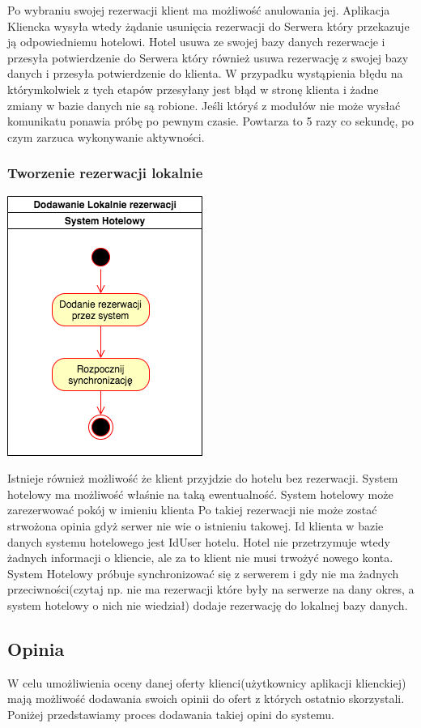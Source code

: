 \documentclass{article}
\begin{document}
Po wybraniu swojej rezerwacji klient ma możliwość anulowania jej. Aplikacja Kliencka wysyła wtedy żądanie usunięcia rezerwacji do Serwera który przekazuje ją odpowiedniemu hotelowi. Hotel usuwa ze swojej bazy danych rezerwacje i przesyła potwierdzenie do Serwera który również usuwa rezerwację z swojej bazy danych i przesyła potwierdzenie do klienta. W przypadku wystąpienia błędu na którymkolwiek z tych etapów przesyłany jest błąd w stronę klienta i żadne zmiany w bazie danych nie są robione.
Jeśli któryś z modułów nie może wysłać komunikatu ponawia próbę po pewnym czasie. Powtarza to 5 razy co sekundę, po czym zarzuca wykonywanie aktywności.
\subsubsection{Tworzenie rezerwacji lokalnie}
\begin{center}
    \includegraphics[scale=1]{Aktywnosc/IO_Aktywności-Local reservation.png}
\end{center}
Istnieje również możliwość że klient przyjdzie do hotelu bez rezerwacji. System hotelowy ma możliwość właśnie na taką ewentualność. System hotelowy może zarezerwować pokój w imieniu klienta Po takiej rezerwacji nie może zostać strwożona opinia gdyż serwer nie wie o istnieniu takowej. Id klienta w bazie danych systemu hotelowego jest IdUser hotelu. Hotel nie przetrzymuje wtedy żadnych informacji o kliencie, ale za to klient nie musi trwożyć nowego konta. System Hotelowy próbuje synchronizować się z serwerem i gdy nie ma żadnych przeciwności(czytaj np. nie ma rezerwacji które były na serwerze na dany okres, a system hotelowy o nich nie wiedział) dodaje rezerwację do lokalnej bazy danych.
\subsection{Opinia}
W celu umożliwienia oceny danej oferty klienci(użytkownicy aplikacji klienckiej) mają możliwość dodawania swoich opinii do ofert z których ostatnio skorzystali. Poniżej przedstawiamy proces dodawania takiej opini do systemu.
\end{document}
